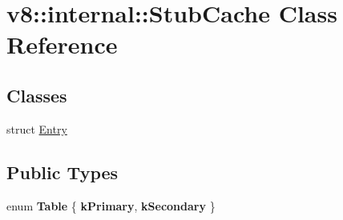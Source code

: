 \hypertarget{classv8_1_1internal_1_1StubCache}{}\section{v8\+:\+:internal\+:\+:Stub\+Cache Class Reference}
\label{classv8_1_1internal_1_1StubCache}
\subsection*{Classes}
\begin{DoxyCompactItemize}
\item 
struct \mbox{\hyperlink{structv8_1_1internal_1_1StubCache_1_1Entry}{Entry}}
\end{DoxyCompactItemize}
\subsection*{Public Types}
\begin{DoxyCompactItemize}
\item 
\mbox{\label{classv8_1_1internal_1_1StubCache_ab15c79e4f18b5d3fbc4ede4c256f35fb}} 
enum {\bfseries Table} \{ {\bfseries k\+Primary}, 
{\bfseries k\+Secondary}
 \}
\end{DoxyCompactItemize}
